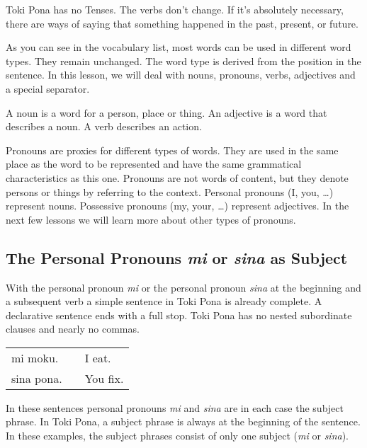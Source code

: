 Toki Pona has no Tenses. 
The verbs don't change. 
If it's absolutely necessary, there are ways of saying that something happened in the past, present, or future. 

As you can see in the vocabulary list, most words can be used in different word types. 
They remain unchanged. 
The word type is derived from the position in the sentence. 
In this lesson, we will deal with nouns, pronouns, verbs, adjectives and a special separator. 

A noun is a word for a person, place or thing. 
An adjective is a word that describes a noun. 
A verb describes an action. 

Pronouns are proxies for different types of words. 
They are used in the same place as the word to be represented and have the same grammatical characteristics as this one.
Pronouns are not words of content, but they denote persons or things by referring to the context. 
Personal pronouns (I, you, \dots) represent nouns. 
Possessive pronouns (my, your, \dots) represent adjectives. 
In the next few lessons we will learn more about other types of pronouns. 

% 
\subsection*{The Personal Pronouns \textit{mi} or \textit{sina} as Subject}
%
%
With the personal pronoun \textit{mi} or the personal pronoun \textit{sina} at the beginning and a subsequent verb a simple sentence in Toki Pona is already complete. 
A declarative sentence ends with a full stop. 
Toki Pona has no nested subordinate clauses and nearly no commas. 

\begin{supertabular}{p{5,5cm}|ll}
mi moku. && I eat. \\
sina pona. && You fix. \\
\end{supertabular} 

In these sentences personal pronouns \textit{mi} and \textit{sina} are in each case the subject phrase. 
In Toki Pona, a subject phrase is always at the beginning of the sentence. 
In these examples, the subject phrases consist of only one subject (\textit{mi} or \textit{sina}).

